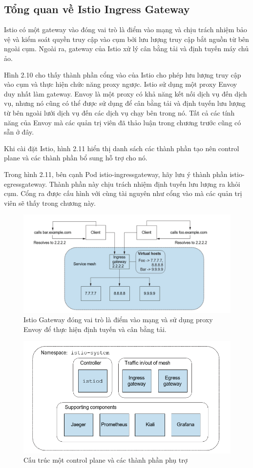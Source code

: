\documentclass[12pt,a4paper]{report}
\begin{document}
		\subsection{Tổng quan về Istio Ingress Gateway}
		\hspace{0.6cm}Istio có một gateway vào đóng vai trò là điểm vào mạng và chịu trách nhiệm bảo vệ và kiểm soát quyền truy cập vào cụm bởi lưu lượng truy cập bắt nguồn từ bên ngoài cụm. Ngoài ra, gateway của Istio xử lý cân bằng tải và định tuyến máy chủ ảo.
		
		Hình 2.10 cho thấy thành phần cổng vào của Istio cho phép lưu lượng truy cập vào cụm và thực hiện chức năng proxy ngược. Istio sử dụng một proxy Envoy duy nhất làm gateway. Envoy là một proxy có khả năng kết nối dịch vụ đến dịch vụ, nhưng nó cũng có thể được sử dụng để cân bằng tải và định tuyến lưu lượng từ bên ngoài lưới dịch vụ đến các dịch vụ chạy bên trong nó. Tất cả các tính năng của Envoy mà các quản trị viên đã thảo luận trong chương trước cũng có sẵn ở đây.
		
		Khi cài đặt Istio, hình 2.11 hiển thị danh sách các thành phần tạo nên control plane và các thành phần bổ sung hỗ trợ cho nó.
		
		Trong hình 2.11, bên cạnh Pod istio-ingressgateway, hãy lưu ý thành phần istio-egressgateway. Thành phần này chịu trách nhiệm định tuyến lưu lượng ra khỏi cụm. Cổng ra được cấu hình với cùng tài nguyên như cổng vào mà các quản trị viên sẽ thấy trong chương này.
		
		\begin{figure}[h!]
			\centering
			\includegraphics[width=0.6\linewidth]{Pics/2.2.1-p1}
			\caption{Istio Gateway đóng vai trò là điểm vào mạng và sử dụng proxy Envoy để thực hiện định tuyến và cân bằng tải.}
			\label{fig:2.2.1-1}
		\end{figure}
		
		\begin{figure}[h!]
			\centering
			\includegraphics[width=0.7\linewidth]{Pics/2.2.1-p2}
			\caption{Cấu trúc một control plane và các thành phần phụ trợ}
			\label{fig:2.2.1-2}
		\end{figure}
		
\end{document}
